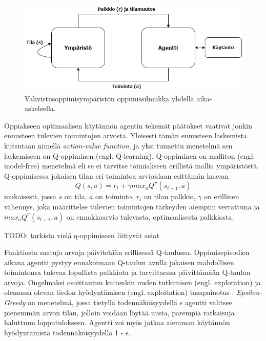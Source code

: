 \documentclass[utf8]{gradu3}
\begin{document}
\begin{figure}[h]
\includegraphics[width=15cm]{reinflearning.png}
\caption{Vahvistusoppimisympäristön oppimissilmukka yhdellä aika-askeleella.}
\label{reinflearning}
\end{figure}

Oppiakseen optimaalisen käytännön agentin tekemät päätökset vaativat jonkin ennusteen tulevien toimintojen arvosta. Yleisesti tämän ennusteen laskemista kutsutaan nimellä \textit{action-value function}, ja yksi tunnettu menetelmä sen laskemiseen on Q-oppiminen (engl. Q-learning). Q-oppiminen on malliton (engl. model-free) menetelmä eli se ei tarvitse toimiakseen erillistä mallia ympäristöstä. Q-oppimisessa jokaisen tilan eri toimintoa arvioidaan \cite{arulkumaran2017brief} esittämän kaavan \[Q(s,a) = r_t + \gamma max_a Q^\pi (s_{t+1},a)\] mukaisesti, jossa \(s\) on tila, \(a\) on toiminto, \(r_t\) on tilan palkkio, $\gamma$ on erillinen vähennys, joka määrittelee tulevien toimintojen tärkeyden aiempiin verrattuna ja \(max_a Q^\pi (s_{t+1},a)\) on ennakkoarvio tulevasta, optimaalisesta palkkiosta.

TODO: tarkista vielä q-oppimiseen liittyvät asiat

Funktiosta saatuja arvoja päivitetään erillisessä Q-taulussa. Oppimisepisodien aikana agentti pystyy ennakoimaan Q-taulun avulla jokaisen mahdollisen toimintonsa tulevaa lopullista palkkiota ja tarvittaessa päivittämään Q-taulun arvoja. Ongelmaksi osoittautuu kuitenkin uuden tutkimisen (engl. exploration) ja olemassa olevan tiedon hyödyntämisen (engl. exploitation) tasapainotus \parencite{arulkumaran2017brief}. \textit{Epsilon-Greedy} on menetelmä, jossa tietyllä todennäköisyydellä $\epsilon$ agentti valitsee pienemmän arvon tilan, jolloin voidaan löytää uusia, parempia ratkaisuja haluttuun lopputulokseen. Agentti voi myös jatkaa aiemman käytännön hyödyntämistä todennäköisyydellä 1 - $\epsilon$.
\end{document}
